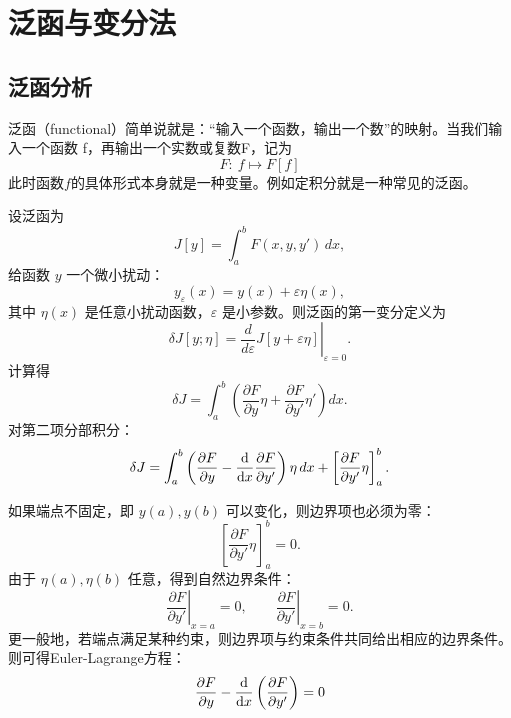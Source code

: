 \chapter{泛函与变分法}
\label{sec:variation}
\section{泛函分析}
\label{sec:functional}

泛函（functional）简单说就是：“输入一个函数，输出一个数”的映射。当我们输入一个函数 
f，再输出一个实数或复数F，记为
\begin{equation}
    F:~f\mapsto F[f]
\end{equation}
此时函数$f$的具体形式本身就是一种变量。例如定积分就是一种常见的泛函。

设泛函为
\begin{equation}
    J[y]=\int_a^b F(x,y,y')\,dx,
\end{equation}
给函数 \(y\) 一个微小扰动：
\begin{equation}
   y_\varepsilon(x)=y(x)+\varepsilon \eta(x),
\end{equation}
其中 \(\eta(x)\) 是任意小扰动函数，\(\varepsilon\) 是小参数。则泛函的第一变分定义为
\begin{equation}
    \delta J[y;\eta]
=\left.\frac{d}{d\varepsilon}J[y+\varepsilon\eta]\right|_{\varepsilon=0}.
\end{equation}
计算得
\begin{equation}
    \delta J
=\int_a^b\left(
\frac{\partial F}{\partial y}\eta
+\frac{\partial F}{\partial y'}\eta'
\right)dx.
\end{equation}
对第二项分部积分：
\begin{equation}
    \delta J
=\int_a^b\left(
\frac{\partial F}{\partial y}
-\frac{\mathrm{d}}{\mathrm{d} x}\frac{\partial F}{\partial y'}
\right)\eta\,dx
+\left[
\frac{\partial F}{\partial y'}\eta
\right]_a^b.
\end{equation}

如果端点不固定，即 \(y(a),y(b)\) 可以变化，则边界项也必须为零：
\begin{equation}
    \left[
\frac{\partial F}{\partial y'}\eta
\right]_a^b=0.
\end{equation}
由于 \(\eta(a),\eta(b)\) 任意，得到自然边界条件：
\begin{equation}
    \left.\frac{\partial F}{\partial y'}\right|_{x=a}=0,
\qquad
\left.\frac{\partial F}{\partial y'}\right|_{x=b}=0.
\end{equation}
更一般地，若端点满足某种约束，则边界项与约束条件共同给出相应的边界条件。则可得Euler-Lagrange方程：
\begin{equation}
    \frac{\partial F}{\partial y}
-\frac{\mathrm{d}}{\mathrm{d} x}\left(\frac{\partial F}{\partial y'}\right)=0
\end{equation}

